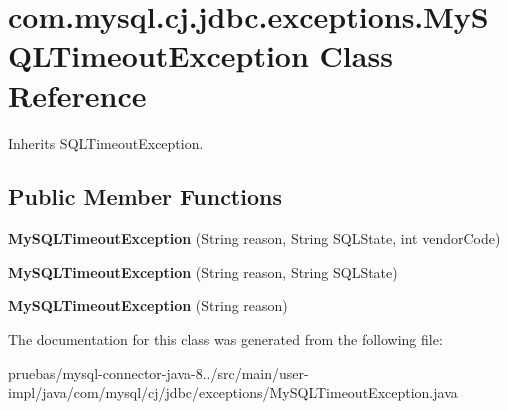 \hypertarget{classcom_1_1mysql_1_1cj_1_1jdbc_1_1exceptions_1_1_my_s_q_l_timeout_exception}{}\section{com.\+mysql.\+cj.\+jdbc.\+exceptions.\+My\+S\+Q\+L\+Timeout\+Exception Class Reference}
\label{classcom_1_1mysql_1_1cj_1_1jdbc_1_1exceptions_1_1_my_s_q_l_timeout_exception}


Inherits S\+Q\+L\+Timeout\+Exception.

\subsection*{Public Member Functions}
\begin{DoxyCompactItemize}
\item 
\mbox{\label{classcom_1_1mysql_1_1cj_1_1jdbc_1_1exceptions_1_1_my_s_q_l_timeout_exception_aa21b8a76b6188df8aa8bf007afc09ac6}} 
{\bfseries My\+S\+Q\+L\+Timeout\+Exception} (String reason, String S\+Q\+L\+State, int vendor\+Code)
\item 
\mbox{\label{classcom_1_1mysql_1_1cj_1_1jdbc_1_1exceptions_1_1_my_s_q_l_timeout_exception_a6e7a777a6fa12a53fc32395fccf4614c}} 
{\bfseries My\+S\+Q\+L\+Timeout\+Exception} (String reason, String S\+Q\+L\+State)
\item 
\mbox{\label{classcom_1_1mysql_1_1cj_1_1jdbc_1_1exceptions_1_1_my_s_q_l_timeout_exception_a47c18912c5a1378906617e7819c23e21}} 
{\bfseries My\+S\+Q\+L\+Timeout\+Exception} (String reason)
\end{DoxyCompactItemize}


The documentation for this class was generated from the following file\+:\begin{DoxyCompactItemize}
\item 
pruebas/mysql-\/connector-\/java-\/8../src/main/user-\/impl/java/com/mysql/cj/jdbc/exceptions/My\+S\+Q\+L\+Timeout\+Exception.\+java\end{DoxyCompactItemize}
